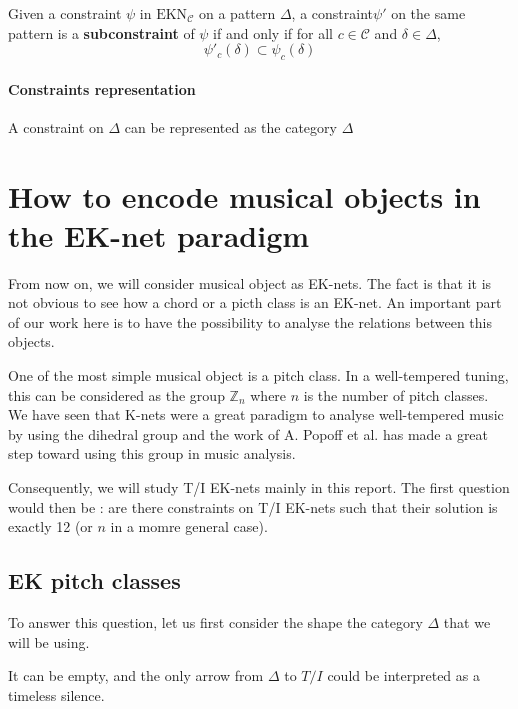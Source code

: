 \begin{defn}[Subconstraint]
    Given a constraint $\psi$ in $\text{EKN}_\mathcal{C}$ on a pattern $\Delta$, a constraint$\psi'$ on the same pattern is a \textbf{subconstraint} of $\psi$ if and only if for all $c\in \mathcal{C}$ and $\delta\in\Delta$,
    $$\psi'_c(\delta)\subset\psi_c(\delta)$$
\end{defn}

\paragraph{Constraints representation}

A constraint on $\Delta$ can be represented as the category $\Delta$








\section{How to encode musical objects in the EK-net paradigm}

From now on, we will consider musical object as EK-nets. The fact is that it is not obvious to see how a chord or a picth class is an EK-net. An important part of our work here is to have the possibility to analyse the relations between this objects.

One of the most simple musical object is a pitch class. In a well-tempered tuning, this can be considered as the group $\mathbb{Z}_n$ where $n$ is the number of pitch classes. We have seen that K-nets were a great paradigm to analyse well-tempered music by using the dihedral group and the work of  A. Popoff et al.\cite{PAAE2016} has made a great step toward using this group in music analysis.

Consequently, we will study T/I EK-nets mainly in this report. The first question would then be : are there constraints on T/I EK-nets such that their  solution is exactly 12 (or $n$ in a momre general case).

\subsection{EK pitch classes}

To answer this question, let us first consider the shape the category $\Delta$ that we will be using.

It can be empty, and the only arrow from $\Delta$ to $T/I$ could be interpreted as a timeless silence.

